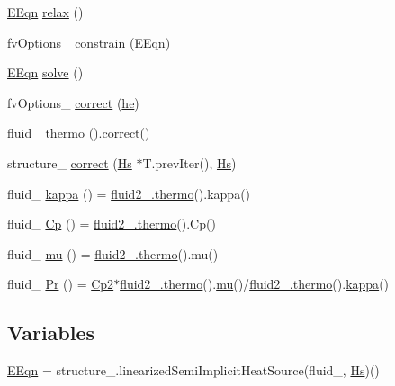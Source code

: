 \begin{DoxyCompactItemize}
\item 
\hyperlink{EEqn__1pl_8H_afbe3b0df5936ee9102f8bea26f93e95a}{E\+Eqn} \hyperlink{EEqn__1p_8H_ada060d6619956dc9185abaefdb79b7d0}{relax} ()
\item 
fv\+Options\+\_\+ \hyperlink{EEqn__1p_8H_ada92f4bf542de36f5c56f50ac3bd22da}{constrain} (\hyperlink{EEqn__1pl_8H_afbe3b0df5936ee9102f8bea26f93e95a}{E\+Eqn})
\item 
\hyperlink{EEqn__1pl_8H_afbe3b0df5936ee9102f8bea26f93e95a}{E\+Eqn} \hyperlink{EEqn__1p_8H_ac123867940006fb14e8346d9bdc38f8d}{solve} ()
\item 
fv\+Options\+\_\+ \hyperlink{EEqn__1p_8H_aa9a0425f27ee9f8374f7b6896dc8bacc}{correct} (\hyperlink{EEqn__1pl_8H_aaacc8fea926e2b83e418a1ad3c1e8c43}{he})
\item 
fluid\+\_\+ \hyperlink{EEqn__1p_8H_a353366dbdc7c1ce1987281023b85fa83}{thermo} ().\hyperlink{hEqn_8H_a3a2458f7f54158be848527a3fdedd5dd}{correct}()
\item 
structure\+\_\+ \hyperlink{EEqn__1p_8H_a1c55d78004105eccfc36bbb342af66a3}{correct} (\hyperlink{EEqn__1pl_8H_ab8fc5669aa3ba2d4b66ff43ff446d633}{Hs} $\ast$T.\+prev\+Iter(), \hyperlink{EEqn__1pl_8H_ab8fc5669aa3ba2d4b66ff43ff446d633}{Hs})
\item 
fluid\+\_\+ \hyperlink{EEqn__1p_8H_ae4b39b2ebd1370f25f73c1898c761287}{kappa} () = \hyperlink{EEqns__2p_8H_a9d615e711281a88a96c648787c7dbd32}{fluid2\+\_\+.\+thermo}().kappa()
\item 
fluid\+\_\+ \hyperlink{EEqn__1p_8H_a46aeb95bd59914587c52fbdce9382fc6}{Cp} () = \hyperlink{EEqns__2p_8H_a9d615e711281a88a96c648787c7dbd32}{fluid2\+\_\+.\+thermo}().Cp()
\item 
fluid\+\_\+ \hyperlink{EEqn__1p_8H_ab1184b82774c9d22cebacfa6994470b7}{mu} () = \hyperlink{EEqns__2p_8H_a9d615e711281a88a96c648787c7dbd32}{fluid2\+\_\+.\+thermo}().mu()
\item 
fluid\+\_\+ \hyperlink{EEqn__1p_8H_a764c55cdfd52f21f7a00341f3bc2e63c}{Pr} () = \hyperlink{EEqns__2p_8H_a4729d684f71ad1966c07480036871539}{Cp2}$\ast$\hyperlink{EEqns__2p_8H_a9d615e711281a88a96c648787c7dbd32}{fluid2\+\_\+.\+thermo}().\hyperlink{EEqns__2p_8H_a5f502f41f7fa5ac3329b38810d2514f6}{mu}()/\hyperlink{EEqns__2p_8H_a9d615e711281a88a96c648787c7dbd32}{fluid2\+\_\+.\+thermo}().\hyperlink{EEqns__2p_8H_acced946b2cb97fb227183c4675fe5fdc}{kappa}()
\end{DoxyCompactItemize}
\subsection*{Variables}
\begin{DoxyCompactItemize}
\item 
\hyperlink{EEqn__1p_8H_a48cf446ed1abc619ddcfc2b831bf4ed9}{E\+Eqn} = structure\+\_\+.\+linearized\+Semi\+Implicit\+Heat\+Source(fluid\+\_\+, \hyperlink{EEqn__1pl_8H_ab8fc5669aa3ba2d4b66ff43ff446d633}{Hs})()
\end{DoxyCompactItemize}


